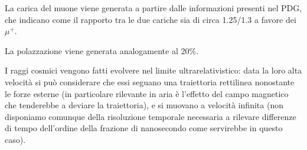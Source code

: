 La carica del muone viene generata a partire dalle informazioni presenti nel PDG, che indicano come il rapporto tra le due cariche sia di circa 1.25/1.3 a favore dei $\mu^+$.

La polazzazione viene generata analogamente al 20\%.

I raggi cosmici vengono fatti evolvere nel limite ultrarelativistico: data la loro alta velocità si può considerare che essi seguano una traiettoria rettilinea nonostante
le forze esterne (in particolare rilevante in aria è l'effetto del campo magnetico che tenderebbe a deviare la traiettoria), e si muovano a velocità infinita (non disponiamo comunque della risoluzione temporale necessaria a rilevare differenze di tempo dell'ordine della frazione di nanosecondo come servirebbe in questo caso).
